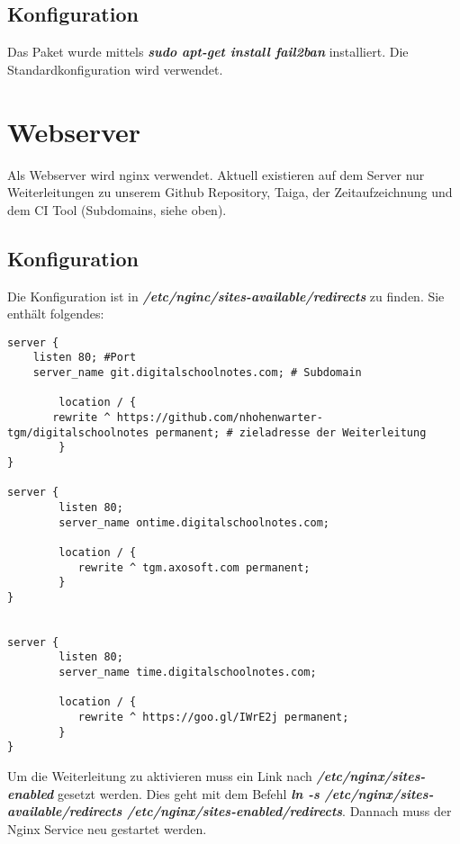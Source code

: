 \documentclass[12pt,a4paper,oneside,ngerman]{scrartcl}
\begin{document}
\subsection{Konfiguration}
Das Paket wurde mittels \textbf{\textit{sudo apt-get install fail2ban}} installiert. Die Standardkonfiguration wird verwendet.

\section{Webserver}
Als Webserver wird nginx verwendet. Aktuell existieren auf dem Server nur Weiterleitungen zu unserem Github Repository, Taiga, der Zeitaufzeichnung und dem CI Tool (Subdomains, siehe oben).

\subsection{Konfiguration}
Die Konfiguration ist in \textbf{\textit{/etc/nginc/sites-available/redirects}} zu finden. Sie enthält folgendes:

\begin{lstlisting}
server {
	listen 80; #Port
	server_name git.digitalschoolnotes.com; # Subdomain

    	location / {
	   rewrite ^ https://github.com/nhohenwarter-tgm/digitalschoolnotes permanent; # zieladresse der Weiterleitung
    	}
}

server {
        listen 80;
        server_name ontime.digitalschoolnotes.com;

        location / {
           rewrite ^ tgm.axosoft.com permanent;
        }
}


server {
        listen 80;
        server_name time.digitalschoolnotes.com;

        location / {
           rewrite ^ https://goo.gl/IWrE2j permanent;
        }
}

\end{lstlisting}

Um die Weiterleitung zu aktivieren muss ein Link nach \textbf{\textit{/etc/nginx/sites-enabled}} gesetzt werden. Dies geht mit dem Befehl \textbf{\textit{ln -s /etc/nginx/sites-available/redirects /etc/nginx/sites-enabled/redirects}}. Dannach muss der Nginx Service neu gestartet werden.

 



\end{document}
